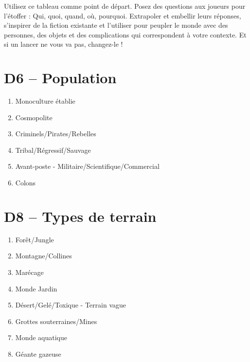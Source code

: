 \documentclass{article}
\begin{document}
\title{\vspace{-0.5cm}{\Huge One-Roll Planètes} \vspace{-1cm}}

\date{}

\maketitle

Utilisez ce tableau comme point de départ. Posez des questions aux joueurs pour l'étoffer : Qui, quoi, quand, où, pourquoi. Extrapoler et embellir leurs réponses, s'inspirer de la fiction existante et l'utiliser pour peupler le monde avec des personnes, des objets et des complications qui correspondent à votre contexte. Et si un lancer ne vous va pas, changez-le !


\begin{multicols}{2}
	\section*{D6 -- Population}
	\begin{enumerate}
		\item Monoculture établie
		\item Cosmopolite 
		\item Criminels/Pirates/Rebelles
		\item Tribal/Régressif/Sauvage
		\item Avant-poste - Militaire/Scientifique/Commercial
		\item Colons
	\end{enumerate}
	\section*{D8 -- Types de terrain}
	\begin{enumerate}
		\item Forêt/Jungle
		\item Montagne/Collines
		\item Marécage
		\item Monde Jardin
		\item Désert/Gelé/Toxique - Terrain vague
		\item Grottes souterraines/Mines
		\item Monde aquatique
		\item Géante gazeuse
	\end{enumerate}

\end{multicols}
\end{document}
